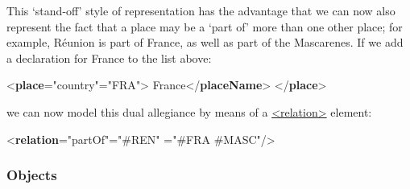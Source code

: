 This ‘stand-off’ style of representation has the advantage that we can now also represent the fact that a place may be a ‘part of’ more than one other place; for example, Réunion is part of France, as well as part of the Mascarenes. If we add a declaration for France to the list above: \par\bgroup{}\exampleFont \begin{shaded}\noindent\mbox{}{<\textbf{place}\hspace*{1em}{type}="{country}"\hspace*{1em}{xml:id}="{FRA}">}\mbox{}\newline 
{}France{</\textbf{placeName}>}\mbox{}\newline 
{</\textbf{place}>}\end{shaded}\egroup\par \noindent  we can now model this dual allegiance by means of a \hyperref[TEI.relation]{<relation>} element: \par\bgroup{}\exampleFont \begin{shaded}\noindent\mbox{}{<\textbf{relation}\hspace*{1em}{name}="{partOf}"\hspace*{1em}{active}="{\#REN}"\mbox{}\newline 
\hspace*{1em}{passive}="{\#FRA \#MASC}"/>}\end{shaded}\egroup\par 
\subsubsection[{Objects}]{Objects}\label{NDOBJ}\par

